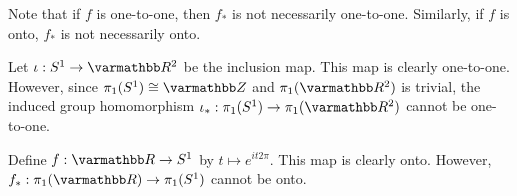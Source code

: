 \begin{remark}
    Note that if $f$ is one-to-one, then $f_\ast$ is not necessarily one-to-one. Similarly, if $f$ is onto, $f_\ast$ is not necessarily onto.
\end{remark}

\begin{example}
    Let $\iota:S^1 \rightarrow \bfR^2$ be the inclusion map. This map is clearly one-to-one. However, since $\pi_1(S^1) \cong \bfZ$ and $\pi_1(\bfR^2)$ is trivial, the induced group homomorphism $\iota_\ast:\pi_1(S^1) \rightarrow \pi_1(\bfR^2)$ cannot be one-to-one.
\end{example}

\begin{example}
    Define $f:\bfR \rightarrow S^1$ by $t \mapsto e^{it2\pi}$. This map is clearly onto. However, $f_\ast : \pi_1(\bfR) \rightarrow \pi_1(S^1)$ cannot be onto.
\end{example}

\begin{proposition}
    
\end{proposition}